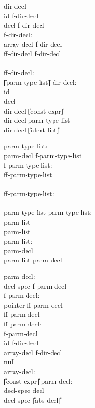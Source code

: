 \begin{center}
\PAIR 
{
dir-decl: \\
\>	id f-dir-decl  \\
\>	 \T{(} decl \T{)} f-dir-decl \\ 
f-dir-decl: \\ 
\>	array-decl f-dir-decl \\
\>	\T{(} ff-dir-decl f-dir-decl \\
\>	 \\
ff-dir-decl: \\
\>	\U{[}parm-type-list\U{]} \T{)}
}
{
dir-decl: \\
\>	id \\
\>	\T{(} decl \T{)} \\
\>	dir-decl \T{[} \U{[}const-expr\U{]} \T{]} \\
\>	dir-decl \T{(} parm-type-list \T{)} \\
\>	dir-decl \T{(} \underline{\U{[}ident-list\U{]}} \T{)} 
}

\PAIR
{
parm-type-list: \\
\>	parm-decl f-parm-type-list \\
f-parm-type-list: \\
\>	\T{,} ff-parm-type-list  \\
\>	 \\
ff-parm-type-list: \\
\>	 \\
\>	parm-type-list 
}
{
parm-type-list: \\
\>	parm-list \\
\>	parm-list \T{,}  \\
parm-list: \\
\>	parm-decl \\
\>	parm-list \T{,} parm-decl 
}

\PAIR
{
parm-decl: \\
\>	decl-spec f-parm-decl \\
f-parm-decl:\\
\>	pointer ff-parm-decl \\
\>      ff-parm-decl \\
ff-parm-decl:\\
\>      \T{(} f-parm-decl \T{)} \\
\>	id  f-dir-decl\\
\>      array-decl f-dir-decl \\
\>      null \\
array-decl: \\
\>	\T{[} \U{[}const-expr\U{]} \T{]} 
}
{
parm-decl: \\
\>	decl-spec decl \\
\>	decl-spec \U{[}abs-decl\U{]} 
}



\end{center}
